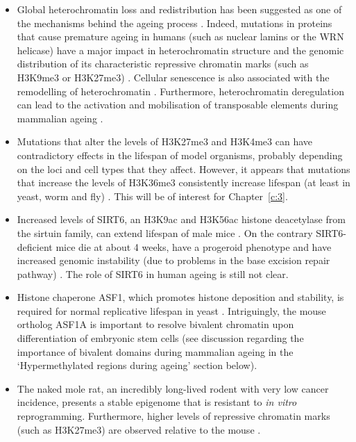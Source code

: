 \begin{itemize}
	
	\item Global heterochromatin loss and redistribution has been suggested as one of the mechanisms behind the ageing process \citep{Villeponteau1997, Tsurumi2012}. Indeed, mutations in proteins that cause premature ageing in humans (such as nuclear lamins or the WRN helicase) have a major impact in heterochromatin structure and the genomic distribution of its characteristic repressive chromatin marks (such as H3K9me3 or H3K27me3) \citep{Zhang2015b}. Cellular senescence is also associated with the remodelling of heterochromatin \citep{Zhang2007}. Furthermore, heterochromatin deregulation can lead to the activation and mobilisation of transposable elements during mammalian ageing \citep{DeCecco2013}. 
	
	\item Mutations that alter the levels of H3K27me3 and H3K4me3 can have contradictory effects in the lifespan of model organisms, probably depending on the loci and cell types that they affect. However, it appears that mutations that increase the levels of H3K36me3 consistently increase lifespan (at least in yeast, worm and fly) \citep{Booth2016,Benayoun2015a,Pal2016,Sen2016}. This will be of interest for Chapter~\ref{c:3}.
	
	\item Increased levels of SIRT6, an H3K9ac and H3K56ac histone deacetylase from the sirtuin family, can extend lifespan of male mice \citep{Kanfi2012}. On the contrary SIRT6-deficient mice die at about 4 weeks, have a progeroid phenotype  and have increased genomic instability (due to problems in the base excision repair pathway) \citep{Mostoslavsky2006}. The role of SIRT6 in human ageing is still not clear. 
	
	\item Histone chaperone ASF1, which promotes histone deposition and stability, is required for normal replicative lifespan in yeast \citep{Feser2010}. Intriguingly, the mouse ortholog ASF1A is important to resolve bivalent chromatin upon differentiation of embryonic stem cells \citep{Gao2018} (see discussion regarding the importance of bivalent domains during mammalian ageing in the `Hypermethylated regions during ageing' section below).
	
	\item The naked mole rat, an incredibly long-lived rodent with very low cancer incidence, presents a stable epigenome that is resistant to \textit{in vitro} reprogramming. Furthermore, higher levels of repressive chromatin marks (such as H3K27me3) are observed relative to the mouse \citep{Tan2017}. 
	
\end{itemize}


